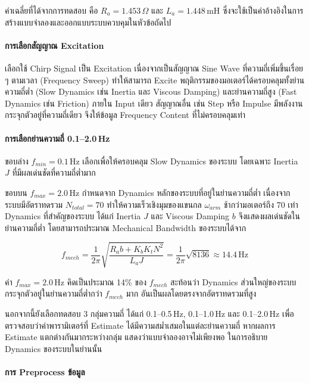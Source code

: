 ค่าเฉลี่ยที่ได้จากการทดสอบ คือ $R_a = 1.453\,\Omega$ และ $L_a = 1.448\,\text{mH}$
ซึ่งจะใช้เป็นค่าอ้างอิงในการสร้างแบบจำลองและออกแบบระบบควบคุมในหัวข้อถัดไป

\paragraph{การเลือกสัญญาณ Excitation}

เลือกใช้ Chirp Signal เป็น Excitation เนื่องจากเป็นสัญญาณ Sine Wave 
ที่ความถี่เพิ่มขึ้นเรื่อย ๆ ตามเวลา (Frequency Sweep) 
ทำให้สามารถ Excite พฤติกรรมของมอเตอร์ได้ครอบคลุมทั้งย่านความถี่ต่ำ 
(Slow Dynamics เช่น Inertia และ Viscous Damping) 
และย่านความถี่สูง (Fast Dynamics เช่น Friction) ภายใน Input เดียว
สัญญาณอื่น เช่น Step หรือ Impulse มีพลังงานกระจุกตัวอยู่ที่ความถี่เดียว
จึงให้ข้อมูล Frequency Content ที่ไม่ครอบคลุมเท่า

\paragraph{การเลือกย่านความถี่ 0.1--2.0\,Hz}

ขอบล่าง $f_{min} = 0.1$\,Hz เลือกเพื่อให้ครอบคลุม Slow Dynamics
ของระบบ โดยเฉพาะ Inertia $J$ ที่มีผลเด่นชัดที่ความถี่ต่ำมาก

ขอบบน $f_{max} = 2.0$\,Hz กำหนดจาก Dynamics หลักของระบบที่อยู่ในย่านความถี่ต่ำ
เนื่องจากระบบมีอัตราทดรวม $N_{total} = 70$ ทำให้ความเร็วเชิงมุมของแขนกล $\omega_{arm}$
ช้ากว่ามอเตอร์ถึง 70 เท่า Dynamics ที่สำคัญของระบบ ได้แก่ Inertia $J$ และ
Viscous Damping $b$ จึงแสดงผลเด่นชัดในย่านความถี่ต่ำ โดยสามารถประมาณ
Mechanical Bandwidth ของระบบได้จาก

\begin{equation}
    f_{mech} = \frac{1}{2\pi}\sqrt{\frac{R_a b + K_b K_t N^2}{L_a J}}
             = \frac{1}{2\pi}\sqrt{8136}
             \approx 14.4\,\text{Hz}
    \label{eq:f_mech}
\end{equation}

ค่า $f_{max} = 2.0$\,Hz คิดเป็นประมาณ 14\% ของ $f_{mech}$ สะท้อนว่า
Dynamics ส่วนใหญ่ของระบบกระจุกตัวอยู่ในย่านความถี่ต่ำกว่า $f_{mech}$ มาก
อันเป็นผลโดยตรงจากอัตราทดรวมที่สูง

นอกจากนี้ยังเลือกทดสอบ 3 กลุ่มความถี่ ได้แก่
0.1--0.5\,Hz, 0.1--1.0\,Hz และ 0.1--2.0\,Hz
เพื่อตรวจสอบว่าค่าพารามิเตอร์ที่ Estimate ได้มีความสม่ำเสมอในแต่ละย่านความถี่
หากผลการ Estimate แตกต่างกันมากระหว่างกลุ่ม แสดงว่าแบบจำลองอาจไม่เพียงพอ
ในการอธิบาย Dynamics ของระบบในย่านนั้น

\paragraph{การ Preprocess ข้อมูล}

